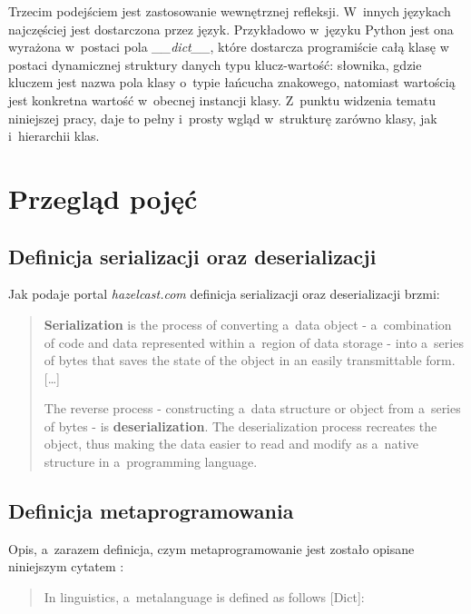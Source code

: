 \documentclass[12pt]{article}
\newcommand{\n}{\newline}
\newcommand{\nonpl}[1]{{\it #1}}
\newcommand{\code}[1]{{\it #1}}
\begin{document}
{		Trzecim podejściem jest zastosowanie wewnętrznej refleksji. W~innych językach najczęściej jest dostarczona przez język.
		Przykładowo w~języku Python jest ona wyrażona w~postaci pola \code{\_\_dict\_\_}, które dostarcza programiście całą klasę
		w postaci dynamicznej struktury danych typu klucz-wartość: słownika, gdzie kluczem jest nazwa pola klasy o~typie
		łańcucha znakowego, natomiast wartością jest konkretna wartość w~obecnej instancji klasy. Z~punktu widzenia tematu
		niniejszej pracy, daje to pełny i~prosty wgląd w~strukturę zarówno klasy, jak i~hierarchii klas.
	}

	{
		\section{Przegląd pojęć}

		{
			\subsection{Definicja serializacji oraz deserializacji}

			Jak podaje portal \nonpl{hazelcast.com}\cite{definitions_serial_and_deserial} definicja serializacji oraz deserializacji brzmi:

			\begin{quotation}
				{\bf Serialization} is the process of converting a~data object - a~combination of code
				and data represented within a~region of data storage - into a~series of bytes that
				saves the state of the object in an easily transmittable form. [\ldots]\n

				The reverse process - constructing a~data structure or object from a~series of
				bytes - is {\bf deserialization}. The deserialization process recreates the object,
				thus making the data easier to read and modify as a~native structure in a~programming language.
			\end{quotation}
		}

		{
			\subsection{Definicja metaprogramowania}

			Opis, a~zarazem definicja, czym metaprogramowanie jest zostało opisane niniejszym cytatem \cite{metaprogramming_definition}:

			\begin{quotation}
					In linguistics, a~metalanguage is defined as follows [Dict]:\n


\end{quotation}}}
\end{document}
